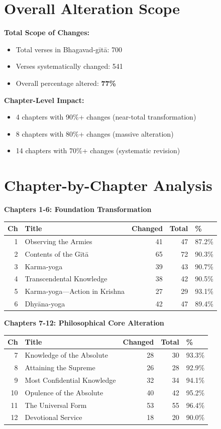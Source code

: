\documentclass[11pt,twoside]{book}
\begin{document}
\section*{Overall Alteration Scope}
\label{sec:org1f49b64}

\textbf{\textbf{Total Scope of Changes:}}
\begin{itemize}
\item Total verses in Bhagavad-gītā: 700
\item Verses systematically changed: 541
\item Overall percentage altered: \textbf{\textbf{77\%}}
\end{itemize}

\textbf{\textbf{Chapter-Level Impact:}}
\begin{itemize}
\item 4 chapters with 90\%+ changes (near-total transformation)
\item 8 chapters with 80\%+ changes (massive alteration)
\item 14 chapters with 70\%+ changes (systematic revision)
\end{itemize}
\section*{Chapter-by-Chapter Analysis}
\label{sec:org9b0c686}

\textbf{\textbf{Chapters 1-6: Foundation Transformation}}

\small
\begin{center}
\begin{tabular}{rlrrl}
Ch & Title & Changed & Total & \%\\
\hline
1 & Observing the Armies & 41 & 47 & 87.2\%\\
2 & Contents of the Gītā & 65 & 72 & 90.3\%\\
3 & Karma-yoga & 39 & 43 & 90.7\%\\
4 & Transcendental Knowledge & 38 & 42 & 90.5\%\\
5 & Karma-yoga—Action in Krishna & 27 & 29 & 93.1\%\\
6 & Dhyāna-yoga & 42 & 47 & 89.4\%\\
\end{tabular}
\end{center}

\textbf{\textbf{Chapters 7-12: Philosophical Core Alteration}}

\small
\begin{center}
\begin{tabular}{rlrrl}
Ch & Title & Changed & Total & \%\\
\hline
7 & Knowledge of the Absolute & 28 & 30 & 93.3\%\\
8 & Attaining the Supreme & 26 & 28 & 92.9\%\\
9 & Most Confidential Knowledge & 32 & 34 & 94.1\%\\
10 & Opulence of the Absolute & 40 & 42 & 95.2\%\\
11 & The Universal Form & 53 & 55 & 96.4\%\\
12 & Devotional Service & 18 & 20 & 90.0\%\\
\end{tabular}
\end{center}
\end{document}
